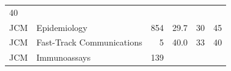 \documentclass[11pt,]{article}
\begin{document}
\begin{longtable}[]{@{}llrrrr@{}}
\begin{minipage}[t]{0.11\columnwidth}
40\strut
\end{minipage}\tabularnewline
\begin{minipage}[t]{0.06\columnwidth}\raggedright\strut
JCM\strut
\end{minipage} & \begin{minipage}[t]{0.43\columnwidth}\raggedright\strut
Epidemiology\strut
\end{minipage} & \begin{minipage}[t]{0.04\columnwidth}\raggedleft\strut
854\strut
\end{minipage} & \begin{minipage}[t]{0.08\columnwidth}\raggedleft\strut
29.7\strut
\end{minipage} & \begin{minipage}[t]{0.11\columnwidth}\raggedleft\strut
30\strut
\end{minipage} & \begin{minipage}[t]{0.11\columnwidth}\raggedleft\strut
45\strut
\end{minipage}\tabularnewline
\begin{minipage}[t]{0.06\columnwidth}\raggedright\strut
JCM\strut
\end{minipage} & \begin{minipage}[t]{0.43\columnwidth}\raggedright\strut
Fast-Track Communications\strut
\end{minipage} & \begin{minipage}[t]{0.04\columnwidth}\raggedleft\strut
5\strut
\end{minipage} & \begin{minipage}[t]{0.08\columnwidth}\raggedleft\strut
40.0\strut
\end{minipage} & \begin{minipage}[t]{0.11\columnwidth}\raggedleft\strut
33\strut
\end{minipage} & \begin{minipage}[t]{0.11\columnwidth}\raggedleft\strut
40\strut
\end{minipage}\tabularnewline
\begin{minipage}[t]{0.06\columnwidth}\raggedright\strut
JCM\strut
\end{minipage} & \begin{minipage}[t]{0.43\columnwidth}\raggedright\strut
Immunoassays\strut
\end{minipage} & \begin{minipage}[t]{0.04\columnwidth}\raggedleft\strut
139\strut
\end{minipage} & \begin{minipage}[t]{0.08\columnwidth}\raggedleft\strut

\end{minipage}
\end{longtable}
\end{document}
